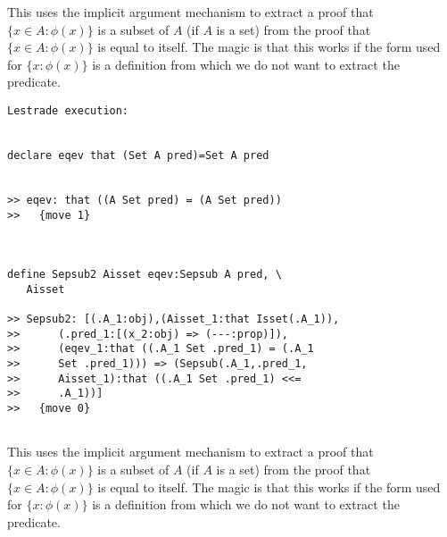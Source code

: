 \documentclass[12pt]{article}
\begin{document}
This uses the implicit argument mechanism to extract a proof that $\{x \in A:\phi(x)\}$ is a subset of $A$ (if $A$ is a set) from the proof that $\{x \in A:\phi(x)\}$ is equal to itself.
The magic is that this works if the form used for $\{x : \phi(x)\}$ is a definition from which we do not want to extract the predicate.

\begin{verbatim}Lestrade execution:


declare eqev that (Set A pred)=Set A pred


>> eqev: that ((A Set pred) = (A Set pred))
>>   {move 1}



define Sepsub2 Aisset eqev:Sepsub A pred, \
   Aisset

>> Sepsub2: [(.A_1:obj),(Aisset_1:that Isset(.A_1)),
>>      (.pred_1:[(x_2:obj) => (---:prop)]),
>>      (eqev_1:that ((.A_1 Set .pred_1) = (.A_1
>>      Set .pred_1))) => (Sepsub(.A_1,.pred_1,
>>      Aisset_1):that ((.A_1 Set .pred_1) <<=
>>      .A_1))]
>>   {move 0}


\end{verbatim}

This uses the implicit argument mechanism to extract a proof that $\{x \in A:\phi(x)\}$ is a subset of $A$ (if $A$ is a set) from the proof that $\{x \in A:\phi(x)\}$ is equal to itself.
The magic is that this works if the form used for $\{x : \phi(x)\}$ is a definition from which we do not want to extract the predicate.
\end{document}
